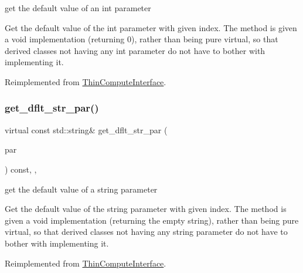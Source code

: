 get the default value of an int parameter 

Get the default value of the int parameter with given index. The method is given a void implementation (returning 0), rather than being pure virtual, so that derived classes not having any int parameter do not have to bother with implementing it. 

Reimplemented from \mbox{\hyperlink{class_s_m_spp__di__unipi__it_1_1_thin_compute_interface_aee367363e42f86be5376165878f958f5}{Thin\+Compute\+Interface}}.

\mbox{\label{class_s_m_spp__di__unipi__it_1_1_f_real_objective_a4d332ec2a836a87b0bd3b3539752e89f}} 
\subsubsection{\texorpdfstring{get\+\_\+dflt\+\_\+str\+\_\+par()}{get\_dflt\_str\_par()}}
{\footnotesize\ttfamily virtual const std\+::string\& get\+\_\+dflt\+\_\+str\+\_\+par (\begin{DoxyParamCaption}\item[{const \mbox{\hyperlink{class_s_m_spp__di__unipi__it_1_1_thin_compute_interface_aa3d710629ad8c434286726ad810c3b47}{idx\+\_\+type}}}]{par }\end{DoxyParamCaption}) const\hspace{0.3cm}{\ttfamily [inline]}, {\ttfamily [override]}, {\ttfamily [virtual]}}



get the default value of a string parameter 

Get the default value of the string parameter with given index. The method is given a void implementation (returning the empty string), rather than being pure virtual, so that derived classes not having any string parameter do not have to bother with implementing it. 

Reimplemented from \mbox{\hyperlink{class_s_m_spp__di__unipi__it_1_1_thin_compute_interface_a0b058687744cfc2e91a20187c56566ca}{Thin\+Compute\+Interface}}.

